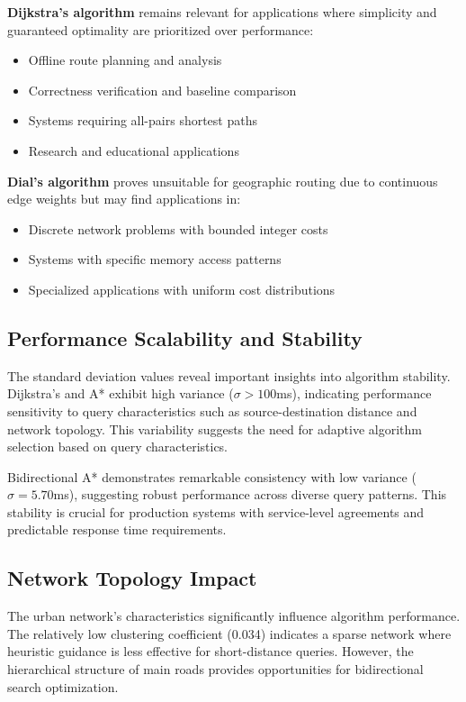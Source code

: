 \documentclass[conference]{IEEEtran}
\begin{document}
\textbf{Dijkstra's algorithm} remains relevant for applications where simplicity and guaranteed optimality are prioritized over performance:
\begin{itemize}
\item Offline route planning and analysis
\item Correctness verification and baseline comparison
\item Systems requiring all-pairs shortest paths
\item Research and educational applications
\end{itemize}

\textbf{Dial's algorithm} proves unsuitable for geographic routing due to continuous edge weights but may find applications in:
\begin{itemize}
\item Discrete network problems with bounded integer costs
\item Systems with specific memory access patterns
\item Specialized applications with uniform cost distributions
\end{itemize}

\subsection{Performance Scalability and Stability}

The standard deviation values reveal important insights into algorithm stability. Dijkstra's and A* exhibit high variance ($\sigma > 100$ms), indicating performance sensitivity to query characteristics such as source-destination distance and network topology. This variability suggests the need for adaptive algorithm selection based on query characteristics.

Bidirectional A* demonstrates remarkable consistency with low variance ($\sigma = 5.70$ms), suggesting robust performance across diverse query patterns. This stability is crucial for production systems with service-level agreements and predictable response time requirements.

\subsection{Network Topology Impact}

The urban network's characteristics significantly influence algorithm performance. The relatively low clustering coefficient (0.034) indicates a sparse network where heuristic guidance is less effective for short-distance queries. However, the hierarchical structure of main roads provides opportunities for bidirectional search optimization.
\end{document}
